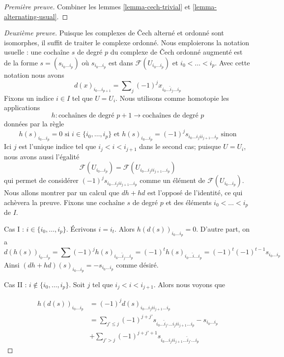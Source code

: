 \begin{proof}
[Première preuve] Combiner les lemmes \ref{lemma-cech-trivial} et \ref{lemma-alternating-usual}.
\end{proof}

\begin{proof}
[Deuxième preuve] Puisque les complexes de {\v C}ech alterné et ordonné sont isomorphes, il suffit de traiter le complexe ordonné. Nous emploierons la notation usuelle : une cochaîne $s$ de degré $p$
du complexe de {\v C}ech ordonné augmenté est de la forme
$s = (s_{i_0 \ldots i_p})$ où $s_{i_0 \ldots i_p}$ est dans
$\mathcal{F}(U_{i_0 \ldots i_p})$ et $i_0 < \ldots < i_p$. Avec cette notation nous avons
$$
d(x)_{i_0 \ldots i_{p + 1}} =
\sum\nolimits_j (-1)^j x_{i_0 \ldots \hat i_j \ldots i_p}
$$
Fixons un indice $i \in I$ tel que $U = U_i$. Nous utilisons comme homotopie les applications
$$
h : \text{cochaînes de degré }p + 1 \to \text{cochaînes de degré }p
$$
données par la règle
$$
h(s)_{i_0 \ldots i_p} = 0 \text{ si } i \in \{i_0, \ldots, i_p\}
\text{ et }
h(s)_{i_0 \ldots i_p} = 
(-1)^j s_{i_0 \ldots i_j i i_{j + 1} \ldots i_p} \text{ sinon}
$$
Ici $j$ est l'unique indice tel que $i_j < i < i_{j + 1}$ dans le second cas; puisque $U = U_i$, nous avons aussi l'égalité
$$
\mathcal{F}(U_{i_0 \ldots i_p}) =
\mathcal{F}(U_{i_0 \ldots i_j i i_{j + 1} \ldots i_p})
$$
qui permet de considérer
$(-1)^j s_{i_0 \ldots i_j i i_{j + 1} \ldots i_p}$
comme un élément de $\mathcal{F}(U_{i_0 \ldots i_p})$. Nous allons montrer par un calcul que $d h + h d$ est l'opposé de l'identité, ce qui achèvera la preuve. Fixons une cochaîne $s$ de degré $p$ et des éléments
$i_0 < \ldots < i_p$ de $I$.

\medskip\noindent
Cas I : $i \in \{i_0, \ldots, i_p\}$. Écrivons $i = i_t$. Alors $h(d(s))_{i_0 \ldots i_p} = 0$. D'autre part, on a $$
d(h(s))_{i_0 \ldots i_p} =
\sum (-1)^j h(s)_{i_0 \ldots \hat i_j \ldots i_p} =
(-1)^t h(s)_{i_0 \ldots \hat i \ldots i_p} =
(-1)^t (-1)^{t - 1} s_{i_0 \ldots i_p}
$$ Ainsi $(dh + hd)(s)_{i_0 \ldots i_p} = -s_{i_0 \ldots i_p}$ comme désiré.

\medskip\noindent

Cas II : $i \not \in \{i_0, \ldots, i_p\}$. Soit $j$ tel que
$i_j < i < i_{j + 1}$. Alors nous voyons que

\begin{align*}
h(d(s))_{i_0 \ldots i_p}
& =
(-1)^j d(s)_{i_0 \ldots i_j i i_{j + 1} \ldots i_p} \\
& =
\sum\nolimits_{j' \leq j} (-1)^{j + j'}
s_{i_0 \ldots \hat i_{j'} \ldots i_j i i_{j + 1} \ldots i_p} -
s_{i_0 \ldots i_p} \\
&
+ \sum\nolimits_{j' > j} (-1)^{j + j' + 1}
s_{i_0 \ldots i_j i i_{j + 1} \ldots \hat i_{j'} \ldots i_p}
\end{align*}


\end{proof}
